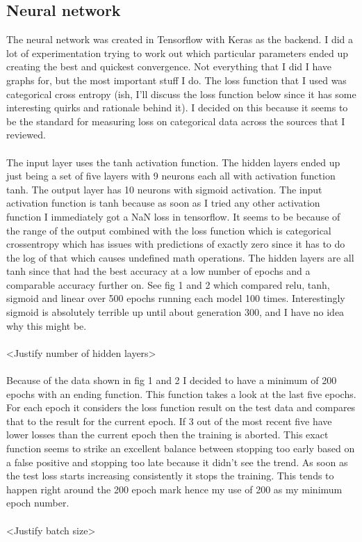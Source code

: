 \documentclass[conference]{IEEEtran}
\begin{document}
\subsection{Neural network}
The neural network was created in Tensorflow with Keras as the backend. I did a lot of experimentation trying to work out which particular parameters ended up creating the best and quickest convergence. Not everything that I did I have graphs for, but the most important stuff I do. The loss function that I used was categorical cross entropy (ish, I'll discuss the loss function below since it has some interesting quirks and rationale behind it). I decided on this because it seems to be the standard for measuring loss on categorical data across the sources that I reviewed.
\\\\
The input layer uses the tanh activation function. The hidden layers ended up just being a set of five layers with 9 neurons each all with activation function tanh. The output layer has 10 neurons with sigmoid activation. The input activation function is tanh because as soon as I tried any other activation function I immediately got a NaN loss in tensorflow. It seems to be because of the range of the output combined with the loss function which is categorical crossentropy which has issues with predictions of exactly zero since it has to do the log of that which causes undefined math operations. The hidden layers are all tanh since that had the best accuracy at a low number of epochs and a comparable accuracy further on. See fig 1 and 2 which compared relu, tanh, sigmoid and linear over 500 epochs running each model 100 times. Interestingly sigmoid is absolutely terrible up until about generation 300, and I have no idea why this might be.
\\\\
<Justify number of hidden layers>
\\\\
Because of the data shown in fig 1 and 2 I decided to have a minimum of 200 epochs with an ending function. This function takes a look at the last five epochs. For each epoch it considers the loss function result on the test data and compares that to the result for the current epoch. If 3 out of the most recent five have lower losses than the current epoch then the training is aborted. This exact function seems to strike an excellent balance between stopping too early based on a false positive and stopping too late because it didn't see the trend. As soon as the test loss starts increasing consistently it stops the training. This tends to happen right around the 200 epoch mark hence my use of 200 as my minimum epoch number.
\\\\
<Justify batch size>
\end{document}
